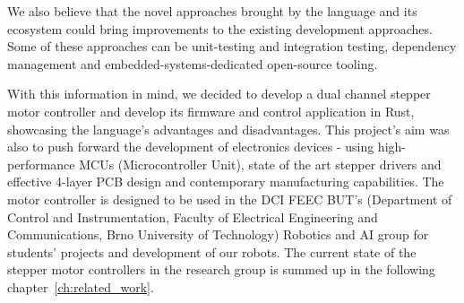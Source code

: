 We also believe that the novel approaches brought by the language and its ecosystem could bring improvements to the existing development approaches.
Some of these approaches can be unit-testing and integration testing, dependency management and embedded-systems-dedicated open-source tooling.

With this information in mind, we decided to develop a dual channel stepper motor controller and develop its firmware and control application in Rust, showcasing the language's advantages and disadvantages.
This project's aim was also to push forward the development of electronics devices - using high-performance MCUs (Microcontroller Unit), state of the art stepper drivers and effective 4-layer PCB design and contemporary manufacturing capabilities.
The motor controller is designed to be used in the DCI FEEC BUT's (Department of Control and Instrumentation, Faculty of Electrical Engineering and Communications, Brno University of Technology) Robotics and AI group for students' projects and development of our robots.
The current state of the stepper motor controllers in the research group is summed up in the following chapter~\ref{ch:related_work}.

